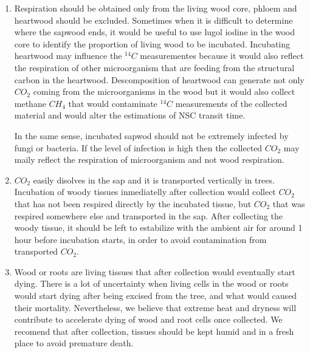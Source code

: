 \documentclass{article}
\begin{document}
\begin{enumerate}

\item   Respiration should be obtained only from the living wood core, phloem and heartwood should be excluded.
Sometimes when it is difficult to determine where the sapwood ends, it would be useful to use lugol iodine in the wood core to identify the proportion of living wood to be incubated. 
Incubating heartwood may influence the $^{14}C$ measurementes because it would also reflect the respiration of other microorganism that are feeding from the structural carbon in the heartwood. 
Descomposition of heartwood can generate not only $CO_{2}$ coming from the microorganisms in the wood but it would also collect methane $CH_{4}$ that would contaminate $^{14}C$ measurements of the collected material and would alter the estimations of NSC transit time. 

In the same sense, incubated sapwod should not be extremely infected by fungi or bacteria.
If the level of infection is high then the collected $CO_{2}$ may maily reflect the respiration of microorganism and not wood respiration. 


\item  $CO_{2}$ easily disolves in the sap and it is transported vertically in trees. Incubation of woody tissues inmediatelly after collection would collect $CO_{2}$ that has not been respired directly by the incubated tissue, but $CO_{2}$ that was respired somewhere else and transported in the sap. 
After collecting the woody tissue, it should be left to estabilize with the ambient air for around 1 hour before incubation starts, in order to avoid contamination from transported $CO_{2}$. 

\item  Wood or roots are living tissues that after collection would eventually start dying. 
There is a lot of uncertainty when living cells in the wood or roots would start dying after being excised from the tree, and what would caused their mortality. 
Nevertheless, we believe that extreme heat and dryness will contribute to accelerate dying of wood and root cells once collected. 
We recomend that after collection, tissues should be kept humid and in a fresh place to avoid premature death. 



\end{enumerate}
\end{document}
